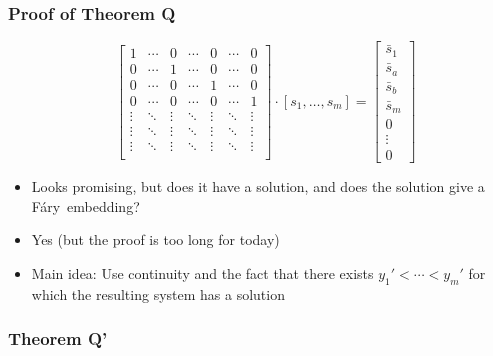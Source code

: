 \documentclass[xcolor=dvipsnames]{beamer}
\newcommand{\Fary}{F\'ary}
\begin{document}
\begin{frame}
   \frametitle{Proof of Theorem Q}
   \[
       \begin{array}{c}
       \end{array}
       \left[\begin{array}{ccccccc}
       1 & \cdots & 0 & \cdots&  0 & \cdots & 0 \\
       0 & \cdots & 1 & \cdots&  0 & \cdots & 0  \\
       0 & \cdots & 0 & \cdots&  1 & \cdots & 0  \\
       0 & \cdots & 0 & \cdots&  0 & \cdots & 1  \\
       \vdots & \ddots & \vdots & \ddots & \vdots & \ddots & \vdots  \\
       \vdots & \ddots & \vdots & \ddots & \vdots & \ddots & \vdots  \\
       \vdots & \ddots & \vdots & \ddots & \vdots & \ddots & \vdots  \\
       \end{array}\right]
       \cdot
       [s_1,\ldots,s_m] =
       \left[\begin{array}{c}
        \bar{s}_1\\
        \bar{s}_a\\
        \bar{s}_b\\
        \bar{s}_m\\
        0\\ 
        \vdots \\
        0
      \end{array}\right]
   \]
   \begin{itemize}[<+->]
     \item Looks promising, but does it have a solution, and does the solution
       give a \Fary\ embedding?
     \item Yes (but the proof is too long for today)
     \item Main idea: Use continuity and the fact that there exists
      $y_1'<\cdots<y_m'$ for which the resulting system has a solution
   \end{itemize}
\end{frame}



\begin{frame}
   \frametitle{Theorem Q'}
\end{frame}
 
\end{document}
